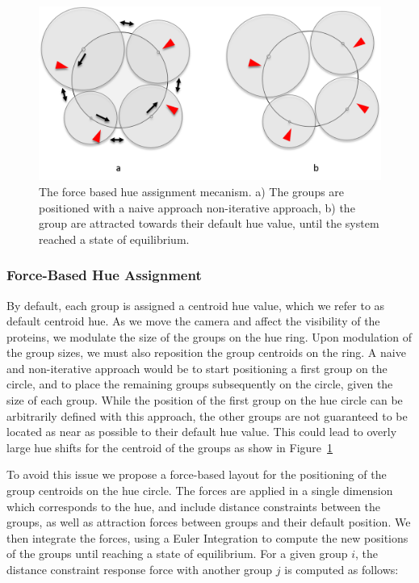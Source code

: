 \documentclass[review,journal]{vgtc}         %
\begin{document}
	\begin{figure}
		\centering
		\includegraphics[width=0.9\linewidth]{"Figures/force-based layout"}
		\caption{The force based hue assignment mecanism. a) The groups are positioned with a naive approach non-iterative approach, b) the group are attracted towards their default hue value, until the system reached a state of equilibrium.}
		\label{fig:force-basedlayout}
	\end{figure}
	
	\subsubsection{Force-Based Hue Assignment}
	
	By default, each group is assigned a centroid hue value, which we refer to as default centroid hue.
	As we move the camera and affect the visibility of the proteins, we modulate the size of the groups on the hue ring.
	Upon modulation of the group sizes, we must also reposition the group centroids on the ring.
	A naive and non-iterative approach would be to start positioning a first group on the circle, and to place the remaining groups subsequently on the circle, given the size of each group.
	While the position of the first group on the hue circle can be arbitrarily defined with this approach, the other groups are not guaranteed to be located as near as possible to their default hue value.
	This could lead to overly large hue shifts for the centroid of the groups as show in Figure~\ref{fig:force-basedlayout}
	
	To avoid this issue we propose a force-based layout for the positioning of the group centroids on the hue circle.
	The forces are applied in a single dimension which corresponds to the hue, and include distance constraints between the groups, as well as attraction forces between groups and their default position.
	We then integrate the forces, using a Euler Integration to compute the new positions of the groups until reaching a state of equilibrium.
	For a given group $i$, the distance constraint response force with another group $j$ is computed as follows:
	
\end{document}
